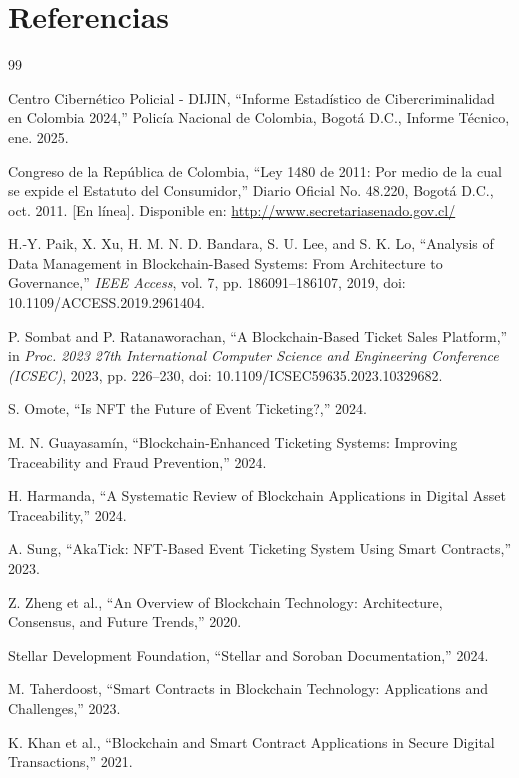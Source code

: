 \documentclass[12pt,a4paper]{article}
\begin{document}
\section{Referencias}
\begin{thebibliography}{99}

Centro Cibernético Policial - DIJIN, ``Informe Estadístico de Cibercriminalidad en Colombia 2024,'' Policía Nacional de Colombia, Bogotá D.C., Informe Técnico, ene. 2025.

Congreso de la República de Colombia, ``Ley 1480 de 2011: Por medio de la cual se expide el Estatuto del Consumidor,'' Diario Oficial No. 48.220, Bogotá D.C., oct. 2011. [En línea]. Disponible en: \url{http://www.secretariasenado.gov.cl/}

H.-Y. Paik, X. Xu, H. M. N. D. Bandara, S. U. Lee, and S. K. Lo, ``Analysis of Data Management in Blockchain-Based Systems: From Architecture to Governance,'' \textit{IEEE Access}, vol. 7, pp. 186091--186107, 2019, doi: 10.1109/ACCESS.2019.2961404.

P. Sombat and P. Ratanaworachan, ``A Blockchain-Based Ticket Sales Platform,'' in \textit{Proc. 2023 27th International Computer Science and Engineering Conference (ICSEC)}, 2023, pp. 226--230, doi: 10.1109/ICSEC59635.2023.10329682.

S. Omote, ``Is NFT the Future of Event Ticketing?,'' 2024.

M. N. Guayasamín, ``Blockchain-Enhanced Ticketing Systems: Improving Traceability and Fraud Prevention,'' 2024.

H. Harmanda, ``A Systematic Review of Blockchain Applications in Digital Asset Traceability,'' 2024.

A. Sung, ``AkaTick: NFT-Based Event Ticketing System Using Smart Contracts,'' 2023.

Z. Zheng et al., ``An Overview of Blockchain Technology: Architecture, Consensus, and Future Trends,'' 2020.

Stellar Development Foundation, ``Stellar and Soroban Documentation,'' 2024.

M. Taherdoost, ``Smart Contracts in Blockchain Technology: Applications and Challenges,'' 2023.

K. Khan et al., ``Blockchain and Smart Contract Applications in Secure Digital Transactions,'' 2021.


\end{thebibliography}
\end{document}
